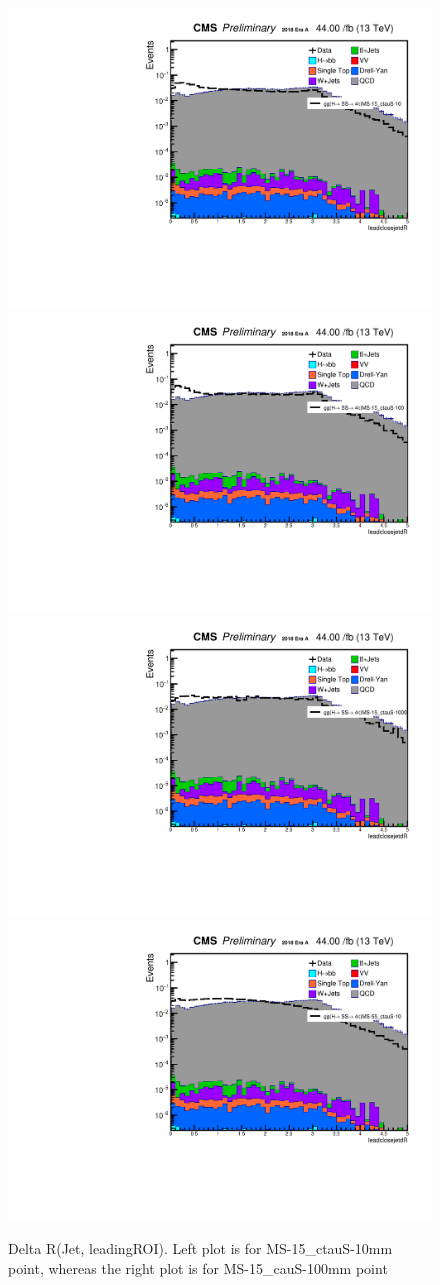 \begin{figure}[h!]
   \caption{Delta R(Jet, leadingROI). Left plot is for MS-15\_ctauS-10mm point, whereas the right plot is for MS-15\_cauS-100mm point}
   \label{fig:JetDeltaRleadSize}
   \centering
   \includegraphics[width=0.47\linewidth]{figs/log_AnalysisNote_MS-15_ctauS-10_leadcloseJetdR.pdf}
   \includegraphics[width=0.47\linewidth]{figs/log_AnalysisNote_MS-15_ctauS-100_leadcloseJetdR.pdf}
   \includegraphics[width=0.47\linewidth]{figs/log_AnalysisNote_MS-15_ctauS-1000_leadcloseJetdR.pdf}
   \includegraphics[width=0.47\linewidth]{figs/log_AnalysisNote_MS-55_ctauS-10_leadcloseJetdR.pdf}
 \end{figure}

